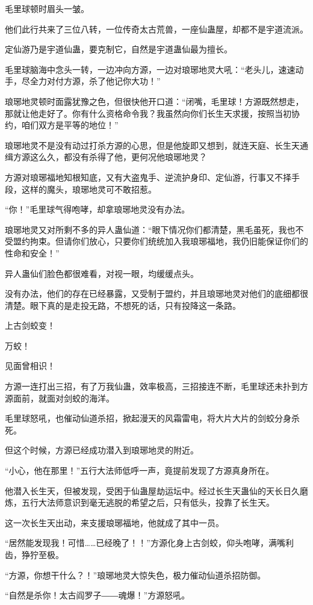 \begin{this_body}
毛里球顿时眉头一皱。

他们此行共来了三位八转，一位传奇太古荒兽，一座仙蛊屋，却都不是宇道流派。

定仙游乃是宇道仙蛊，要克制它，自然是宇道蛊仙最为擅长。

毛里球脑海中念头一转，一边冲向方源，一边对琅琊地灵大吼：“老头儿，速速动手，尽全力对付方源，杀了他记你大功！”

琅琊地灵顿时面露犹豫之色，但很快他开口道：“闭嘴，毛里球！方源既然想走，那就让他走好了。你有什么资格命令我？我虽然向你们长生天求援，按照当初协约，咱们双方是平等的地位！”

琅琊地灵不是没有动过打杀方源的心思，但是他旋即又想到，就连天庭、长生天通缉方源这么久，都没有杀得了他，更何况他琅琊地灵？

方源对琅琊福地知根知底，又有大盗鬼手、逆流护身印、定仙游，行事又不择手段，这样的魔头，琅琊地灵可不敢招惹。

“你！”毛里球气得咆哮，却拿琅琊地灵没有办法。

琅琊地灵又对所剩不多的异人蛊仙道：“眼下情况你们都清楚，黑毛虽死，我也不受盟约拘束。但请你们放心，只要你们统统加入我琅琊福地，我仍旧能保证你们的性命和安全！”

异人蛊仙们脸色都很难看，对视一眼，均缓缓点头。

没有办法，他们的存在已经暴露，又受制于盟约，并且琅琊地灵对他们的底细都很清楚。眼下真的是走投无路，不想死的话，只有投降这一条路。

上古剑蛟变！

万蛟！

见面曾相识！

方源一连打出三招，有了万我仙蛊，效率极高，三招接连不断，毛里球还未扑到方源面前，就面对剑蛟的海洋。

毛里球怒吼，也催动仙道杀招，掀起漫天的风霜雷电，将大片大片的剑蛟分身杀死。

但这个时候，方源已经成功潜入到琅琊地灵的附近。

“小心，他在那里！”五行大法师低呼一声，竟提前发现了方源真身所在。

他潜入长生天，但被发现，受困于仙蛊屋劫运坛中。经过长生天蛊仙的天长日久磨炼，五行大法师意识到毫无逃脱的希望之后，只有低头，投靠了长生天。

这一次长生天出动，来支援琅琊福地，他就成了其中一员。

“居然能发现我！可惜……已经晚了！！”方源化身上古剑蛟，仰头咆哮，满嘴利齿，狰狞至极。

“方源，你想干什么？！”琅琊地灵大惊失色，极力催动仙道杀招防御。

“自然是杀你！太古阎罗子――魂爆！”方源怒吼。


\end{this_body}
